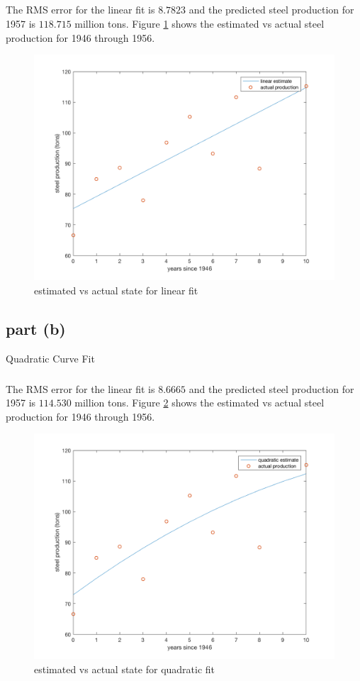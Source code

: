 \documentclass[11pt]{article}
\begin{document}
\subparagraph*{}
The RMS error for the linear fit is $8.7823$ and the predicted steel production for 1957 is $118.715$ million tons. Figure \ref{p1_plot1} shows the estimated vs actual steel production for 1946 through 1956.
\begin{figure}[h!]
	\centering
	\includegraphics[width=0.8\linewidth]{p1_plot1.png}
	\caption{estimated vs actual state for linear fit}
	\label{p1_plot1}
\end{figure}

\subsection*{part (b)}
Quadratic Curve Fit

\subparagraph*{}
The RMS error for the linear fit is $8.6665$ and the predicted steel production for 1957 is $114.530$ million tons. Figure \ref{p1_plot2} shows the estimated vs actual steel production for 1946 through 1956.
\begin{figure}[h!]
	\centering
	\includegraphics[width=0.8\linewidth]{p1_plot2.png}
	\caption{estimated vs actual state for quadratic fit}
	\label{p1_plot2}
\end{figure}
\end{document}
